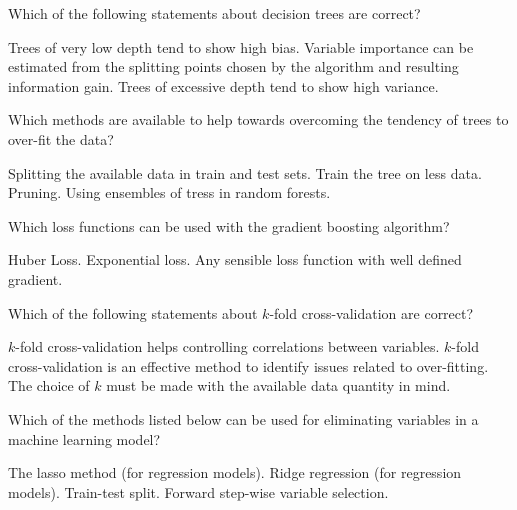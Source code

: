 \documentclass[a4paper,11pt,english,plainsub]{uioexam}
\begin{document}


Which of the following statements about decision trees are correct?

\begin{choicelist}[]
  \choice Trees of very low depth tend to show high bias.
  \choice Variable importance can be estimated from the  splitting
  points chosen by the algorithm and resulting information gain.
  \choice Trees of excessive depth tend to show high variance.
\end{choicelist}


Which methods are available to help towards overcoming the tendency of
trees to over-fit the data?

\begin{choicelist}[]
  \choice Splitting the available data in train and test sets.
  \choice Train the tree on less data.
  \choice Pruning.
  \choice Using ensembles of tress in random forests.
\end{choicelist}


Which loss functions can be used with the gradient boosting algorithm?

\begin{choicelist}[]
  \choice Huber Loss.
  \choice Exponential loss.
  \choice Any sensible loss function with well defined gradient.
\end{choicelist}


Which of the following statements about $k$-fold cross-validation are
correct?

\begin{choicelist}[]
  \choice $k$-fold cross-validation helps controlling correlations
  between variables.
  \choice $k$-fold cross-validation is an effective method to identify
  issues related to over-fitting.
  \choice The choice of $k$ must be made with the available data
  quantity in mind.
\end{choicelist}


Which of the methods listed below can be used for eliminating
variables in a machine learning model?

\begin{choicelist}[]
  \choice The lasso method (for regression models).
  \choice Ridge regression (for regression models).
  \choice Train-test split.
  \choice Forward step-wise variable selection.
\end{choicelist}
\end{document}
